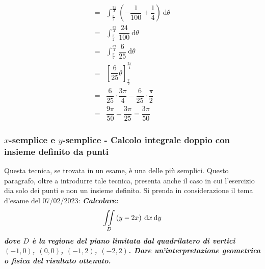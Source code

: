 \documentclass[a4paper]{article}
\begin{document}
\begin{equation*}
\begin{array}{cl}
			=& \displaystyle\int_{\frac{\pi}{2}}^{\frac{3\pi}{4}} \left(-\dfrac{1}{100} + \dfrac{1}{4}\right) \: \mathrm{d}\theta \\ [1.5em]
			=& \displaystyle\int_{\frac{\pi}{2}}^{\frac{3\pi}{4}} \dfrac{24}{100} \: \mathrm{d}\theta \\ [1.5em]
			=& \displaystyle\int_{\frac{\pi}{2}}^{\frac{3\pi}{4}} \dfrac{6}{25} \: \mathrm{d}\theta \\ [1.5em]
			=& \left[\dfrac{6}{25}\theta\right]_{\frac{\pi}{2}}^{\frac{3\pi}{4}} \\ [1.5em]
			=& \dfrac{6}{25} \cdot \dfrac{3\pi}{4} - \dfrac{6}{25} \cdot \dfrac{\pi}{2} \\ [1.5em]
			=& \dfrac{9\pi}{50} - \dfrac{3\pi}{25} = \dfrac{3\pi}{50}
		\end{array}
	\end{equation*}\newpage

	\subsubsection{$x$-semplice e $y$-semplice - Calcolo integrale doppio con insieme definito da punti}\label{par: x-semplice e y-semplice - calcolo integrale doppio}

	Questa tecnica, se trovata in un esame, è una delle più semplici. Questo paragrafo, oltre a introdurre tale tecnica, presenta anche il caso in cui l'esercizio dia solo dei punti e non un insieme definito. Si prenda in considerazione il tema d'esame del 07/02/2023: \textcolor{Green4}{\textbf{\emph{Calcolare:}}
	\begin{equation*}
		\underset{D}{\int\hspace{-.5em}\int} \left(y-2x\right) \: \mathrm{d}x \: \mathrm{d}y
	\end{equation*}
	\textbf{\emph{dove $D$ è la regione del piano limitata dal quadrilatero di vertici $\left(-1,0\right)$, $\left(0,0\right)$, $\left(-1,2\right)$, $\left(-2,2\right)$. Dare un'interpretazione geometrica o fisica del risultato ottenuto.}}}\newline
\end{document}
